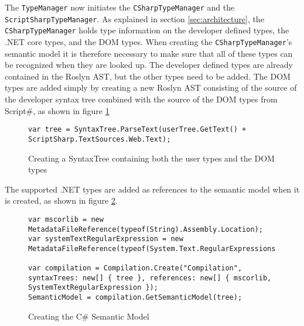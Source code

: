 
The \texttt{TypeManager} now initiates the \texttt{CSharpTypeManager} and the \texttt{ScriptSharpTypeManager}. As explained in section \ref{sec:architecture}, the \texttt{CSharpTypeManager} holds type information on the developer defined types, the .NET core types, and the DOM types.
 When creating the \texttt{CSharpTypeManager}'s semantic model it is therefore necessary to make sure that all of these types can be recognized when they are looked up. The developer defined types are already contained in the Roslyn AST, but the other types need to be added. The DOM types are added simply by creating a new Roslyn AST consisting of the source of the developer syntax tree combined with the source of the DOM types from Script\#, as shown in figure \ref{fig:init_mics_add_dom_types}

\begin{figure}[H]
\begin{lstlisting}[language=CSharp,classoffset=1,morekeywords={SyntaxTree}]
var tree = SyntaxTree.ParseText(userTree.GetText() + ScriptSharp.TextSources.Web.Text);
\end{lstlisting}
\caption{Creating a SyntaxTree containing both the user types and the DOM types}
\label{fig:init_mics_add_dom_types}
\end{figure}

The supported .NET types are added as references to the semantic model when it is created, as shown in figure \ref{fig:init_mics_create_semantic_model}.



\begin{figure}[H]
\begin{lstlisting}[language=CSharp,classoffset=1,morekeywords={MetadataFileReference,Regex,String,Compilation}]
var mscorlib = new MetadataFileReference(typeof(String).Assembly.Location);
var systemTextRegularExpression = new MetadataFileReference(typeof(System.Text.RegularExpressions.Regex).Assembly.Location);

var compilation = Compilation.Create("Compilation", syntaxTrees: new[] { tree }, references: new[] { mscorlib, SystemTextRegularExpression });
SemanticModel = compilation.GetSemanticModel(tree);
\end{lstlisting}
\caption{Creating the C\# Semantic Model}
\label{fig:init_mics_create_semantic_model}
\end{figure}

